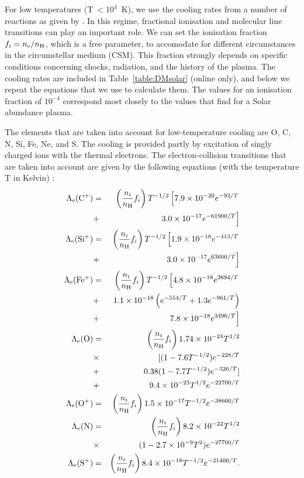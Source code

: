 \documentclass[floatfix,traditabstract,preprint2]{aa}
\begin{document}
For low temperatures (T$\ <10^4$~K), we use the cooling rates from a number of reactions as given by \citet{1972DalgarnoMcCray}. 
In this regime, fractional ionisation and molecular line transitions can play an important role. We can set the ionisation fraction $f_{i}=n_{\rm e}/n_{\rm H}$, which is a free parameter, to accomodate for different circumstances in the circumstellar medium (CSM). This fraction strongly depends on specific conditions concerning shocks, radiation, and the history of the plasma. The cooling rates are included in Table~\ref{table:DMsolar} (online only), and below we repeat the equations that we use to calculate them. The values for an ionisation fraction of $10^{-4}$ correspond most closely to the values that \citet{2008Smithetal} find for a Solar abundance plasma. 

The elements that are taken into account for low-temperature cooling are O, C, N, Si, Fe, Ne, and S. The cooling is provided partly by excitation of singly charged ions with the thermal electrons. The electron-collision transitions that are taken into account are given by the following equations (with the temperature T in Kelvin) \citep{1972DalgarnoMcCray}: 
\begin{eqnarray}
\label{eq:Ce}
\Lambda_{\rm e}({\rm C^+})&=&\left(\frac{n_i}{n_{\rm H}} f_i \right)T^{-1/2}\left[ 7.9\times10^{-20}e^{-92/T}\right. \\\nonumber
       &+& \left. 3.0 \times 10^{-17} e^{-61900/T}\right]\\
\Lambda_{\rm e}({\rm Si^+})&=&\left(\frac{n_i}{n_{\rm H}} f_i \right)T^{-1/2}\left[ 1.9\times10^{-18}e^{-413/T}\right. \\\nonumber
       &+& \left. 3.0\times 10^{-17}e^{63600/T}\right]\\
\Lambda_{\rm e}({\rm Fe^+})&=&\left(\frac{n_i}{n_{\rm H}} f_i \right)T^{-1/2}\left[4.8\times 10^{-18}e^{2694/T}\right.  \\\nonumber  
&+&1.1\times10^{-18}\left(e^{-554/T}+1.3e^{-961/T}\right)\\\nonumber
       &+& \left. 7.8\times 10^{-18}e^{3496/T}\right]\\
\Lambda_{\rm e}({\rm O})&=&\left(\frac{n_i}{n_{\rm H}} f_i \right)1.74\times10^{-24}T^{1/2} \\\nonumber
                                    &\times&[(1-7.6T^{-1/2})e^{-228/T}\\\nonumber
                                   &+&0.38(1-7.7T^{-1/2})e^{-326/T}]\\\nonumber
&+&9.4\times10^{-23}T^{1/2}e^{-22700/T}\\
\Lambda_{\rm e}({\rm O^+})&=&\left(\frac{n_i}{n_{\rm H}} f_i \right)1.5\times10^{-17}T^{-1/2}e^{-38600/T}\\
\Lambda_{\rm e}({\rm N})&=&\left(\frac{n_i}{n_{\rm H}} f_i \right)8.2\times10^{-22}T^{1/2}\\\nonumber
                                    &\times&(1-2.7\times10^{-9}T^2)e^{-27700/T}\\
\Lambda_{\rm e}({\rm S^+})&=&\left(\frac{n_i}{n_{\rm H}} f_i \right)8.4\times10^{-18}T^{-1/2}e^{-21400/T}.\\
\end{eqnarray}
\end{document}
